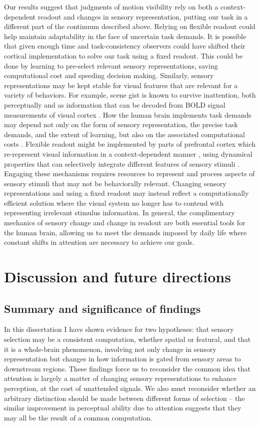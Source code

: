 \documentclass{report}
\begin{document}
Our results suggest that judgments of motion visibility rely on both a context-dependent readout and changes in sensory representation, putting our task in a different part of the continuum described above. Relying on flexible readout could help maintain adaptability in the face of uncertain task demands. It is possible that given enough time and task-consistency observers could have shifted their cortical implementation to solve our task using a fixed readout. This could be done by learning to pre-select relevant sensory representations, saving computational cost and speeding decision making. Similarly, sensory representations may be kept stable for visual features that are relevant for a variety of behaviors. For example, scene gist is known to survive inattention, both perceptually \citep{Li2002-ji} and as information that can be decoded from BOLD signal measurements of visual cortex \citep{Peelen2009-us}. 
How the human brain implements task demands may depend not only on the form of sensory representation, the precise task demands, and the extent of learning, but also on the associated computational costs \citep{Gardner2019-ky}. Flexible readout might be implemented by parts of prefrontal cortex which re-represent visual information in a context-dependent manner \citep{Bugatus2017-wl}, using dynamical properties that can selectively integrate different features of sensory stimuli \citep{Mante2013-tn}. Engaging these mechanisms requires resources to represent and process aspects of sensory stimuli that may not be behaviorally relevant. Changing sensory representations and using a fixed readout may instead reflect a computationally efficient solution where the visual system no longer has to contend with representing irrelevant stimulus information. In general, the complimentary mechanics of sensory change and change in readout are both essential tools for the human brain, allowing us to meet the demands imposed by daily life where constant shifts in attention are necessary to achieve our goals.

\chapter[Discussion]{Discussion and future directions}

\section{Summary and significance of findings}

In this dissertation I have shown evidence for two hypotheses: that sensory selection may be a consistent computation, whether spatial or featural, and that it is a whole-brain phenomenon, involving not only change in sensory representation but changes in how information is gated from sensory areas to downstream regions. These findings force us to reconsider the common idea that attention is largely a matter of changing sensory representations to enhance perception, at the cost of unattended signals. We also must reconsider whether an arbitrary distinction should be made between different forms of selection -- the similar improvement in perceptual ability due to attention suggests that they may all be the result of a common computation. 
\end{document}

